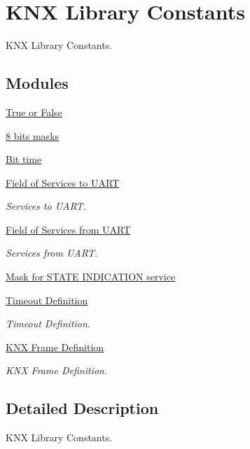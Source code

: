 \hypertarget{group___k_n_x___lib___constants}{}\section{K\+NX Library Constants}
\label{group___k_n_x___lib___constants}


K\+NX Library Constants.  


\subsection*{Modules}
\begin{DoxyCompactItemize}
\item 
\hyperlink{group___true___false}{True or False}
\item 
\hyperlink{group_____bits___masks}{8 bits masks}
\item 
\hyperlink{group___bittime}{Bit time}
\item 
\hyperlink{group___u_a_r_t___control___to}{Field of Services to U\+A\+RT}
\begin{DoxyCompactList}\small\item\em Services to U\+A\+RT. \end{DoxyCompactList}\item 
\hyperlink{group___u_a_r_t___control___from}{Field of Services from U\+A\+RT}
\begin{DoxyCompactList}\small\item\em Services from U\+A\+RT. \end{DoxyCompactList}\item 
\hyperlink{group___u_a_r_t___control___mask}{Mask for S\+T\+A\+T\+E I\+N\+D\+I\+C\+A\+T\+I\+O\+N service}
\item 
\hyperlink{group___k_n_x___timeout}{Timeout Definition}
\begin{DoxyCompactList}\small\item\em Timeout Definition. \end{DoxyCompactList}\item 
\hyperlink{group___k_n_x___frame}{K\+N\+X Frame Definition}
\begin{DoxyCompactList}\small\item\em K\+NX Frame Definition. \end{DoxyCompactList}\end{DoxyCompactItemize}


\subsection{Detailed Description}
K\+NX Library Constants. 

